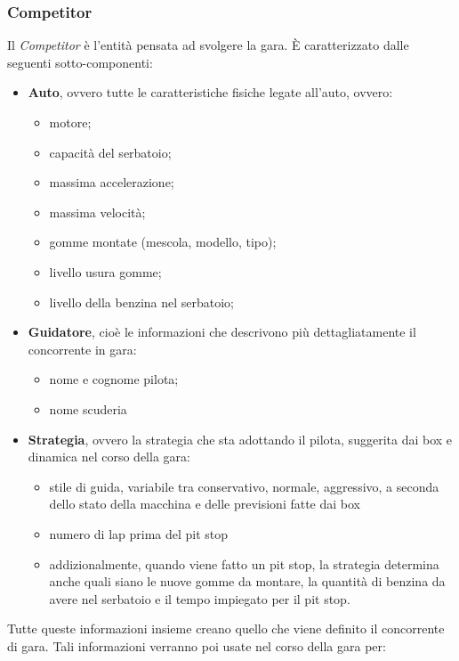 \subsubsection{Competitor}
Il \emph{Competitor} \`{e} l'entit\`{a} pensata ad svolgere la gara. \`{E} caratterizzato dalle seguenti sotto-componenti:
\begin{itemize}
\item \textbf{Auto}, ovvero tutte le caratteristiche fisiche legate all'auto, ovvero:
	\begin{itemize}
		\item motore;
		\item capacit\`{a} del serbatoio;
		\item massima accelerazione;
		\item massima velocit\`{a};
		\item gomme montate (mescola, modello, tipo);
		\item livello usura gomme;
		\item livello della benzina nel serbatoio;
	\end{itemize}
\item \textbf{Guidatore}, cio\`{e} le informazioni che descrivono pi\`{u} dettagliatamente il concorrente in gara:
	\begin{itemize}
		\item nome e cognome pilota;
		\item nome scuderia
	\end{itemize}
\item \textbf{Strategia}, ovvero la strategia che sta adottando il pilota, suggerita dai box e dinamica nel corso della gara:
	\begin{itemize}
		\item stile di guida, variabile tra conservativo, normale, aggressivo, a seconda dello stato della macchina e delle
			previsioni fatte dai box
		\item numero di lap prima del pit stop
		\item addizionalmente, quando viene fatto un pit stop, la strategia determina anche quali siano le nuove gomme da montare,
		 	la quantit\`{a} di benzina da avere nel serbatoio e il tempo impiegato per il pit stop.
	\end{itemize}
\end{itemize}
Tutte queste informazioni insieme creano quello che viene definito il concorrente di gara. 
Tali informazioni verranno poi usate nel corso della gara per:

